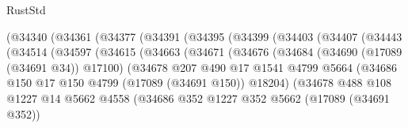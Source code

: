 \begin{lexlean}{RustStd}
\begin{coremodule}
                        (@34340
                          (@34361
                            (@34377
                              (@34391
                                (@34395
                                  (@34399
                                    (@34403
                                      (@34407
                                        (@34443
                                          (@34514
                                            (@34597
                                              (@34615
                                                (@34663
                                                  (@34671
                                                    (@34676
                                                      (@34684
                                                        (@34690 (@17089 (@34691 @34)) @17100)
                                                        (@34678
                                                          @207
                                                          @490
                                                          @17
                                                          @1541
                                                          @4799
                                                          @5664
                                                          (@34686
                                                            @150
                                                            @17
                                                            @150
                                                            @4799
                                                            (@17089 (@34691 @150))
                                                            @18204)
                                                          (@34678
                                                            @488
                                                            @108
                                                            @1227
                                                            @14
                                                            @5662
                                                            @4558
                                                            (@34686
                                                              @352
                                                              @1227
                                                              @352
                                                              @5662
                                                              (@17089 (@34691 @352))

\end{coremodule}
\end{lexlean}
